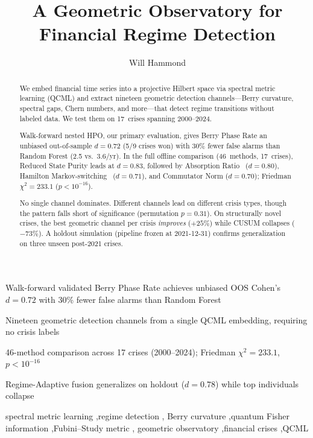 \documentclass[3p]{elsarticle}
\begin{document}
\begin{frontmatter}

\title{A Geometric Observatory for Financial Regime Detection}

\author[pitzer]{Will Hammond}


\begin{highlights}
\item Walk-forward validated Berry Phase Rate achieves unbiased OOS Cohen's $d = 0.72$ with 30\% fewer false alarms than Random Forest
\item Nineteen geometric detection channels from a single QCML embedding, requiring no crisis labels
\item 46-method comparison across 17 crises (2000--2024); Friedman $\chi^2 = 233.1$, $p < 10^{-16}$
\item Regime-Adaptive fusion generalizes on holdout ($d = 0.78$) while top individuals collapse
\end{highlights}

\begin{abstract}
We embed financial time series into a projective Hilbert space via
spectral metric learning (QCML) and extract nineteen geometric
detection channels---Berry curvature, spectral gaps, Chern numbers, and
more---that detect regime transitions without labeled data.
We test them on 17~crises spanning 2000--2024.

Walk-forward nested HPO, our primary evaluation, gives Berry Phase Rate
an unbiased out-of-sample $d = 0.72$ (5/9 crises won) with 30\% fewer
false alarms than Random Forest (2.5 vs.\ 3.6/yr).
In the full offline comparison (46~methods, 17~crises), Reduced State
Purity leads at $d = 0.83$, followed by Absorption
Ratio~\cite{kritzman2011} ($d = 0.80$), Hamilton
Markov-switching~\cite{hamilton1989} ($d = 0.71$), and
Commutator Norm ($d = 0.70$); Friedman
$\chi^2 = 233.1$ ($p < 10^{-16}$).

No single channel dominates.  Different channels lead on different
crisis types, though the pattern falls short of significance
(permutation $p = 0.31$).  On structurally novel crises, the best
geometric channel per crisis \emph{improves} ($+25\%$) while CUSUM
collapses ($-73\%$).  A holdout simulation (pipeline frozen at
2021-12-31) confirms generalization on three unseen post-2021 crises.
\end{abstract}

\begin{keyword}
spectral metric learning \sep regime detection \sep
Berry curvature \sep quantum Fisher information \sep Fubini--Study metric \sep
geometric observatory \sep financial crises \sep QCML
\end{keyword}

\end{frontmatter}
\end{document}
